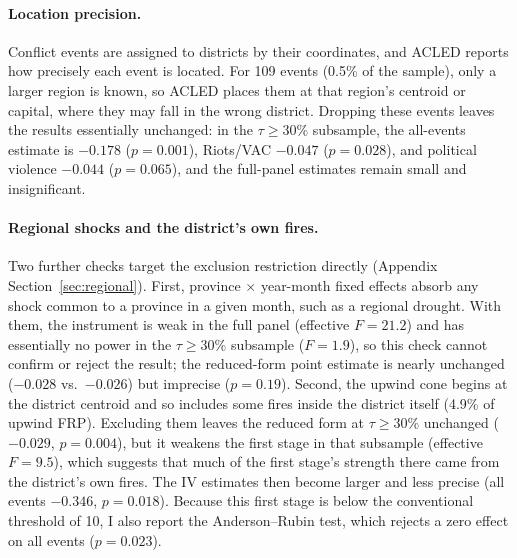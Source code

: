 \documentclass[12pt]{article}
\begin{document}
\paragraph{Location precision.} Conflict events are assigned to districts by their coordinates, and ACLED reports how precisely each event is located. For 109 events (0.5\% of the sample), only a larger region is known, so ACLED places them at that region's centroid or capital, where they may fall in the wrong district. Dropping these events leaves the results essentially unchanged: in the $\tau \geq 30\%$ subsample, the all-events estimate is $-0.178$ ($p=0.001$), Riots/VAC $-0.047$ ($p=0.028$), and political violence $-0.044$ ($p=0.065$), and the full-panel estimates remain small and insignificant.

\paragraph{Regional shocks and the district's own fires.} Two further checks target the exclusion restriction directly (Appendix Section~\ref{sec:regional}). First, province $\times$ year-month fixed effects absorb any shock common to a province in a given month, such as a regional drought. With them, the instrument is weak in the full panel (effective $F = 21.2$) and has essentially no power in the $\tau \geq 30\%$ subsample ($F = 1.9$), so this check cannot confirm or reject the result; the reduced-form point estimate is nearly unchanged ($-0.028$ vs.\ $-0.026$) but imprecise ($p=0.19$). Second, the upwind cone begins at the district centroid and so includes some fires inside the district itself (4.9\% of upwind FRP). Excluding them leaves the reduced form at $\tau \geq 30\%$ unchanged ($-0.029$, $p=0.004$), but it weakens the first stage in that subsample (effective $F = 9.5$), which suggests that much of the first stage's strength there came from the district's own fires. The IV estimates then become larger and less precise (all events $-0.346$, $p=0.018$). Because this first stage is below the conventional threshold of 10, I also report the Anderson--Rubin test, which rejects a zero effect on all events ($p=0.023$).
\end{document}
